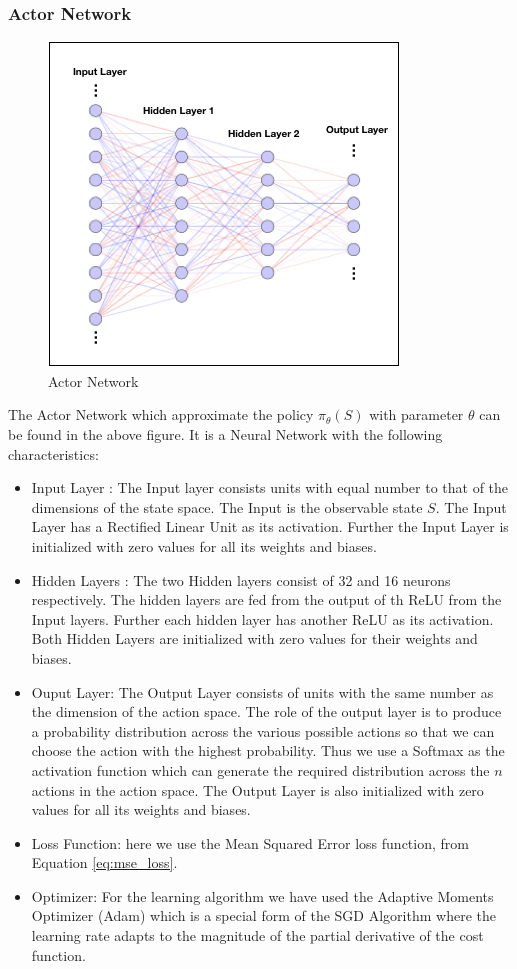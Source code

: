 \documentclass[14pt]{extarticle}
\numberwithin{equation}{section}
\begin{document}
	\subsubsection{Actor Network}
	\begin{figure}[h]
		\vspace{0.2cm}
		\centering
		\includegraphics[scale=0.6]{nn-actor}
		\caption{Actor Network
			\label{nn-actor}}
	\end{figure}
	The Actor Network which approximate the policy $\pi_{\theta}(S)$ with parameter $\theta$ can be found in the above figure. It is a Neural Network with the following characteristics:
	\begin{itemize}
		\item Input Layer : The Input layer consists units with equal number to that of the dimensions of the state space. The Input is the observable state $S$. The Input Layer has a Rectified Linear Unit as its activation. Further the Input Layer is initialized with zero values for all its weights and biases. 
		\item Hidden Layers : The two Hidden layers consist of 32 and 16 neurons respectively. The hidden layers are fed from the output of th ReLU from the Input layers. Further each hidden layer has another ReLU as its activation. Both Hidden Layers are initialized with zero values for their weights and biases.
		\item Ouput Layer: The Output Layer consists of units with the same number as the dimension of the action space. The role of the output layer is to produce a probability distribution across the various possible actions so that we can choose the action with the highest probability. Thus we use a Softmax as the activation function which can generate the required distribution across the $n$ actions in the action space. The Output Layer is also initialized with zero values for all its weights and biases.
		\item Loss Function: here we use the Mean Squared Error loss function, from Equation \eqref{eq:mse_loss}.
		\item Optimizer: For the learning algorithm we have used the Adaptive Moments Optimizer (Adam)\cite{kingma2014adam} which is a special form of the SGD Algorithm where the learning rate adapts to the magnitude of the partial derivative of the cost function. 
	\end{itemize}
\end{document}
